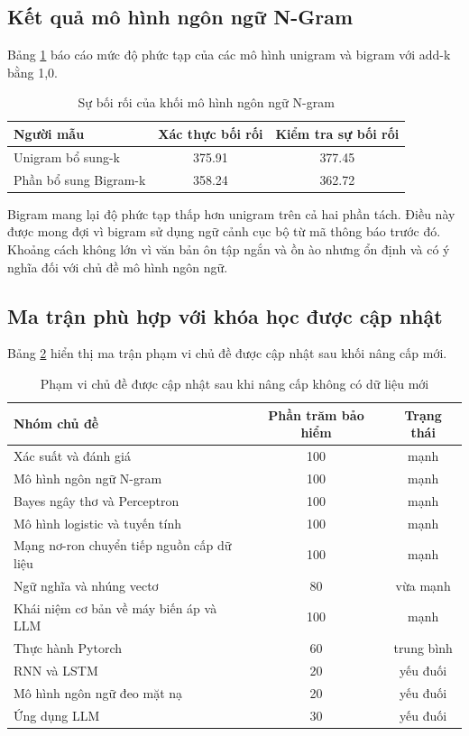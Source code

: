 \documentclass[12pt,a4paper]{article}
\begin{document}
\subsection{Kết quả mô hình ngôn ngữ N-Gram}
Bảng \ref{tab:nlp_ngram_results} báo cáo mức độ phức tạp của các mô hình unigram và bigram với add-k bằng 1,0.

\begin{table}[H]
\centering
\caption{Sự bối rối của khối mô hình ngôn ngữ N-gram}
\label{tab:nlp_ngram_results}
\begin{tabular}{lcc}
\toprule
Người mẫu & Xác thực bối rối & Kiểm tra sự bối rối \\
\midrule
Unigram bổ sung-k & 375.91 & 377.45 \\
Phần bổ sung Bigram-k & 358.24 & 362.72 \\
\bottomrule
\end{tabular}
\end{table}

Bigram mang lại độ phức tạp thấp hơn unigram trên cả hai phần tách. Điều này được mong đợi vì bigram sử dụng ngữ cảnh cục bộ từ mã thông báo trước đó. Khoảng cách không lớn vì văn bản ôn tập ngắn và ồn ào nhưng ổn định và có ý nghĩa đối với chủ đề mô hình ngôn ngữ.

\subsection{Ma trận phù hợp với khóa học được cập nhật}
Bảng \ref{tab:nlp_course_fit} hiển thị ma trận phạm vi chủ đề được cập nhật sau khối nâng cấp mới.

\begin{table}[H]
\centering
\caption{Phạm vi chủ đề được cập nhật sau khi nâng cấp không có dữ liệu mới}
\label{tab:nlp_course_fit}
\begin{tabular}{lcc}
\toprule
Nhóm chủ đề & Phần trăm bảo hiểm & Trạng thái \\
\midrule
Xác suất và đánh giá & 100 & mạnh \\
Mô hình ngôn ngữ N-gram & 100 & mạnh \\
Bayes ngây thơ và Perceptron & 100 & mạnh \\
Mô hình logistic và tuyến tính & 100 & mạnh \\
Mạng nơ-ron chuyển tiếp nguồn cấp dữ liệu & 100 & mạnh \\
Ngữ nghĩa và nhúng vectơ & 80 & vừa mạnh \\
Khái niệm cơ bản về máy biến áp và LLM & 100 & mạnh \\
Thực hành Pytorch & 60 & trung bình \\
RNN và LSTM & 20 & yếu đuối \\
Mô hình ngôn ngữ đeo mặt nạ & 20 & yếu đuối \\
Ứng dụng LLM & 30 & yếu đuối \\
\bottomrule
\end{tabular}
\end{table}
\end{document}

